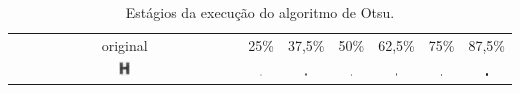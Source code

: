 \documentclass[a4paper,11pt]{article}
\begin{document}
    \begin{center}

    \begin{table}
      \caption{Estágios da execução do algoritmo de Otsu.}
      \begin{tabular}[p]{@{}ccccccc@{}}
        \centering

        original & 25\% & 37,5\% & 50\% & 62,5\% & 75\% & 87,5\% \\

        \includegraphics[width=0.05\textwidth]{assets/binarization/gray3_big.png}
        &
        \includegraphics[width=0.05\textwidth]{assets/binarization/h25t.png}
        &
        \includegraphics[width=0.05\textwidth]{assets/binarization/h38t.png}
        &
        \includegraphics[width=0.05\textwidth]{assets/binarization/h50t.png}
        &
        \includegraphics[width=0.05\textwidth]{assets/binarization/h63t.png}
        &
        \includegraphics[width=0.05\textwidth]{assets/binarization/h75t.png}
        &
        \includegraphics[width=0.05\textwidth]{assets/binarization/h88t.png}
        \\



\end{tabular}
\end{table}
\end{center}
\end{document}
